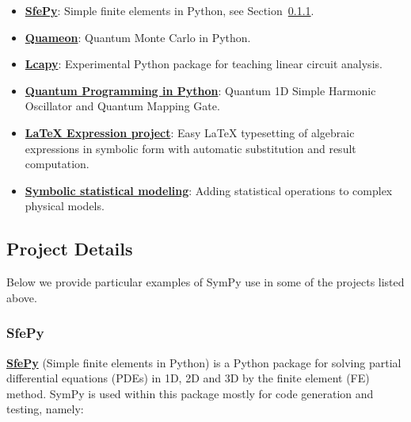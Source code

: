 \begin{itemize}
\item
  \href{http://sfepy.org/}{\textbf{SfePy}}: Simple finite elements in
  Python, see Section~\ref{sfepy}.
\item
  \href{http://quameon.sourceforge.net/}{\textbf{Quameon}}: Quantum
  Monte Carlo in Python.
\item
  \href{http://lcapy.elec.canterbury.ac.nz/}{\textbf{Lcapy}}:
  Experimental Python package for teaching linear circuit analysis.
\item
  \href{http://digitalcommons.calpoly.edu/cgi/viewcontent.cgi?article=1072\&context=physsp/}{\textbf{Quantum
  Programming in Python}}: Quantum 1D Simple Harmonic Oscillator and
  Quantum Mapping Gate.
\item
  \href{http://mech.fsv.cvut.cz/~stransky/software/latexexpr/doc/}{\textbf{LaTeX
  Expression project}}: Easy LaTeX typesetting of algebraic expressions
  in symbolic form with automatic substitution and result computation.
\item
  \href{https://www.researchgate.net/publication/260585491_Symbolic_Statistics_with_SymPy/}{\textbf{Symbolic
  statistical modeling}}: Adding statistical operations to complex
  physical models.
\end{itemize}

\subsection{Project Details}\label{projects-details}

Below we provide particular examples of SymPy use in some of the projects
listed above.

\subsubsection{SfePy}\label{sfepy}

\href{http://sfepy.org/}{\textbf{SfePy}} (Simple finite elements in Python) is
a Python package for solving partial differential equations (PDEs) in 1D, 2D
and 3D by the finite element (FE) method. SymPy is used within this package
mostly for code generation and testing, namely:

